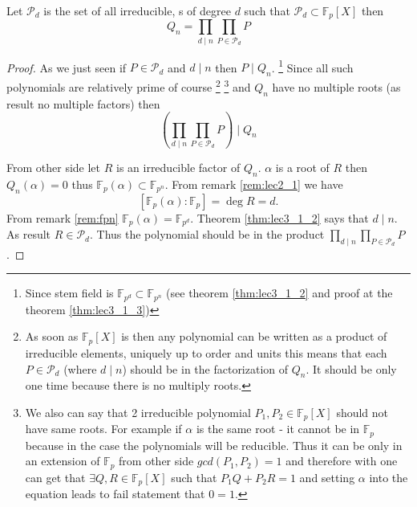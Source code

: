 \begin{corollary}
  Let $\mathcal{P}_d$ is the set of all irreducible,
  s of degree $d$ such that
  $\mathcal{P}_d \subset \mathbb{F}_p\left[X\right]$ then 
  \[
  Q_n = \prod_{d \mid n} \prod_{P \in \mathcal{P}_d} P
  \]
  \begin{proof}
    As we just seen if $P \in \mathcal{P}_d$ and $d \mid n$ then
    $P \mid Q_n$.
    \footnote{
      Since stem field is $\mathbb{F}_{p^d} \subset \mathbb{F}_{p^n}$
      (see theorem \ref{thm:lec3_1_2} and proof at the theorem
      \ref{thm:lec3_1_3}) 
    }
    Since all such polynomials are relatively prime of course
    \footnote{
      As soon as $\mathbb{F}_p\left[X\right]$ is 
      then any polynomial can be written as a product of irreducible
      elements, uniquely up to order and units this means that each
      $P \in \mathcal{P}_d$ (where $d \mid n$) should be in the
      factorization of $Q_n$. It should be only one time because there
      is no multiply roots. 
    }
    \footnote{
      We also can say that 2 irreducible polynomial
      $P_1, P_2 \in \mathbb{F}_p\left[X\right]$ should not have same
      roots. For example if $\alpha$ is the same root - it cannot be
      in $\mathbb{F}_p$ because in the case the polynomials will be
      reducible. Thus it can be only in an extension of $\mathbb{F}_p$
      from other side $gcd(P_1,P_2) = 1$ and therefore with
       one can get that $\exists Q,R \in
      \mathbb{F}_p\left[X\right]$ such that
      \(
      P_1 Q + P_2 R = 1
      \) and setting $\alpha$ into the equation leads to fail
      statement that $0 = 1$.
      }
    and $Q_n$ have no multiple roots (as result no multiple factors) 
    then
    \[
    \left(\prod_{d \mid n} \prod_{P \in \mathcal{P}_d} P \right)\mid Q_n
    \]

    From other side let $R$ is an irreducible factor of $Q_n$.
    $\alpha$ is a root of $R$ then $Q_n\left(\alpha\right) = 0$ thus
    $\mathbb{F}_p\left(\alpha\right) \subset \mathbb{F}_{p^n}$.
    From remark \ref{rem:lec2_1} we have
    \[
    \left[\mathbb{F}_p\left(\alpha\right) : \mathbb{F}_p\right] = \deg
    R = d.
    \]
    From remark \ref{rem:fpn}
    $\mathbb{F}_p\left(\alpha\right) = \mathbb{F}_{p^d}$.
    Theorem \ref{thm:lec3_1_2} says that $d \mid n$.
    As result $R \in \mathcal{P}_d$. Thus the 
    polynomial should be in the product
    $\prod_{d \mid n} \prod_{P \in \mathcal{P}_d} P$.
  \end{proof}
\end{corollary}

